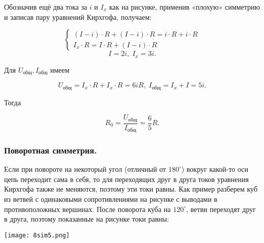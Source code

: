 \documentclass[12pt, a4paper]{article}%
\begin{document}
Обозначив ещё два тока за $i$ и $I_x$ как на рисунке, применив «плохую» симметрию и записав пару уравнений Кирхгофа, получаем:


\[
\begin{cases}
(I-i)\cdot R +(I-i)\cdot R = i\cdot R +i\cdot R  \\
I_x\cdot R = I\cdot R + (I-i)\cdot R
\end{cases}
\]
\[
I = 2i, \; I_x = 3i.
\]

Для $U_\text{общ}, I_\text{общ}$ имеем

\[
U_\text{общ} = I_x\cdot R + I_x\cdot R = 6iR, \; I_\text{общ} = I_x+I = 5i.
\]

Тогда 

\[
R_0 = \frac{U_\text{общ}}{I_\text{общ}} = \frac{6}{5}R.
\]



\subsubsection*{Поворотная симметрия.} Если при повороте на некоторый угол (отличный от $180^\circ$) вокруг какой-то оси цепь
переходит сама в себя, то для переходящих друг в друга токов уравнения Кирхгофа также не меняются, поэтому эти токи равны. 
Как пример разберем куб из ветвей с одинаковыми сопротивлениями на рисунке с выводами в противоположных вершинах. После поворота куба на $120^\circ$, ветви переходят друг в друга, поэтому показанные на рисунке токи равны:

\begin{center}
\texttt{[image: 8sim5.png]}
\label{fig:mpr}
\end{center}
\end{document}
